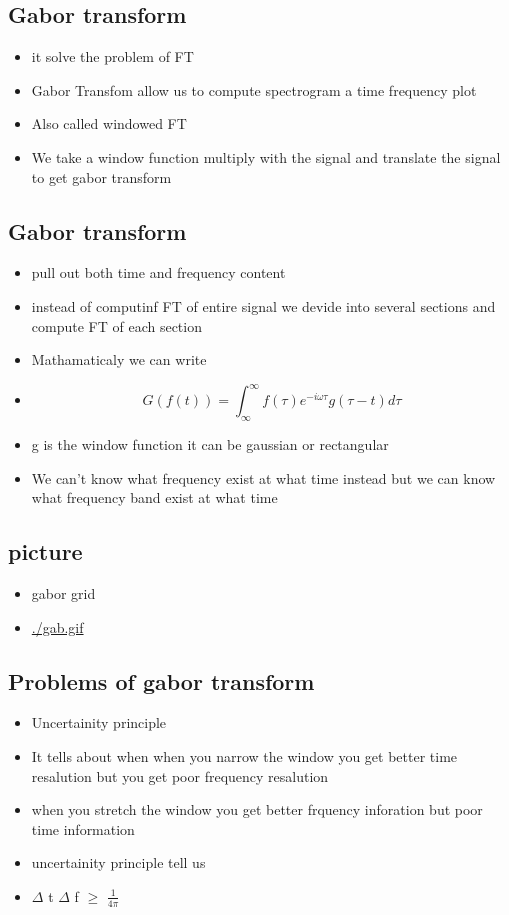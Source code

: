 \documentclass[11pt]{article}
\begin{document}
\subsection{Gabor transform}
\label{sec:org9c94832}
\begin{itemize}
\item it solve the problem of FT
\item Gabor Transfom allow us to compute spectrogram a time frequency plot
\item Also called windowed FT
\item We take a window function multiply with the signal and translate the signal to get gabor transform
\end{itemize}
\subsection{Gabor transform}
\label{sec:org5a270ad}
\begin{itemize}
\item pull out both time and frequency content
\item instead of computinf FT of entire signal we devide into several sections and compute FT of each section
\item Mathamaticaly we can write
\item \[ G(f(t)) = \int_{\infty}^{\infty} f(\tau)e^{-i \omega \tau} g(\tau - t) d \tau \]
\item g is the window function it can be gaussian or rectangular
\item We can't know what frequency exist at what time instead but we can know what frequency band exist at what time
\end{itemize}
\subsection{picture}
\label{sec:orgefbfc4f}
\begin{itemize}
\item gabor grid
\item \url{./gab.gif}
\end{itemize}
\subsection{Problems of gabor transform}
\label{sec:orgf4261a7}
\begin{itemize}
\item Uncertainity principle
\item It tells about when when you narrow the window you get better time resalution but you get poor frequency resalution
\item when you stretch the window you get better frquency inforation but poor time information
\item uncertainity principle tell us
\item \(\Delta\) t \(\Delta\) f \(\ge\) \(\frac{1}{4 \pi}\)
\end{itemize}
\end{document}

